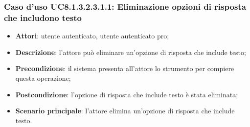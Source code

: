 \subsubsection{Caso d'uso UC8.1.3.2.3.1.1: Eliminazione opzioni di risposta che includono testo}
		\begin{itemize}
		\item
			\textbf{Attori}: utente autenticato, utente autenticato pro;
		\item		
			\textbf{Descrizione}: l'attore può eliminare un'opzione di risposta che include testo;
		\item
			\textbf{Precondizione}: il sistema presenta all'attore lo strumento per compiere questa operazione;
		\item
			\textbf{Postcondizione}: l'opzione di risposta che include testo è stata eliminata;
		\item
			\textbf{Scenario principale}: l'attore elimina un'opzione di risposta che include testo.				
		\end{itemize}

\newpage
